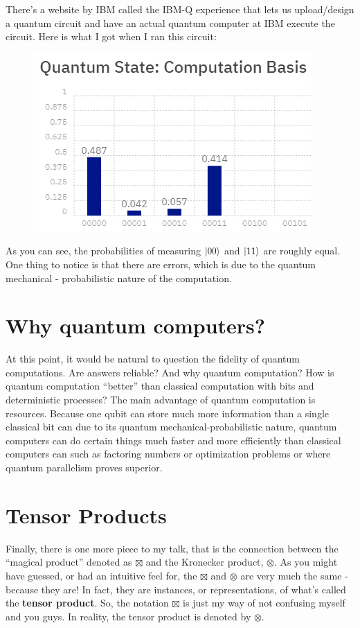 \documentclass[a4paper,11pt]{article}
\numberwithin{equation}{section}
\theoremstyle{definition}
\begin{document}
There's a website by IBM called the IBM-Q experience that lets us upload/design a quantum circuit and have an actual quantum computer at IBM execute the circuit. Here is what I got when I ran this circuit:
	\begin{figure}[h!]
	\centering
	\includegraphics[scale=0.8]{ibmq1.png}
\end{figure}
As you can see, the probabilities of measuring $\left\vert{00}\right\rangle$ and $\left\vert{11}\right\rangle$ are roughly equal. One thing to notice is that there are errors, which is due to the quantum mechanical - probabilistic nature of the computation. 

\section{Why quantum computers?}

At this point, it would be natural to question the fidelity of quantum computations. Are answers reliable? And why quantum computation? How is quantum computation ``better'' than classical computation with bits and deterministic processes? The main advantage of quantum computation is resources. Because one qubit can store much more information than a single classical bit can due to its quantum mechanical-probabilistic nature, quantum computers can do certain things much faster and more efficiently than classical computers can such as factoring numbers or optimization problems or where quantum parallelism proves superior. 


\section{Tensor Products}

Finally, there is one more piece to my talk, that is the connection between the ``magical product'' denoted as $\boxtimes$ and the Kronecker product, $\otimes$. As you might have guessed, or had an intuitive feel for, the $\boxtimes$ and $\otimes$ are very much the same - because they are! In fact, they are instances, or representations, of what's called the \textbf{tensor product}. So, the notation $\boxtimes$ is just my way of not confusing myself and you guys. In reality, the tensor product is denoted by $\otimes$. 
\end{document}
